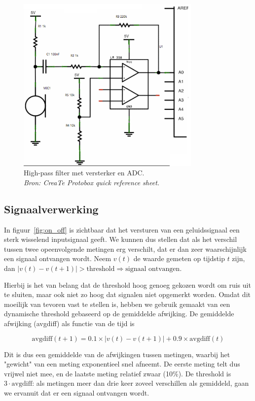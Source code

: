 \documentclass[a4paper,10pt]{article}
\begin{document}
\begin{figure}[ht!]
    \centering
    \includegraphics[width=0.8\textwidth]{high_pass_filter_circuit.png}
    \caption{High-pass filter met versterker en ADC.\\\textit{Bron: CreaTe Protobox quick reference sheet.}}
    \label{fig:circuit}
\end{figure}


\subsection{Signaalverwerking}
In figuur~\ref{fig:on_off} is zichtbaar dat het versturen van een geluidssignaal een sterk wisselend inputsignaal geeft. We kunnen dus stellen dat als het verschil tussen twee opeenvolgende metingen erg verschilt, dat er dan zeer waarschijnlijk een signaal ontvangen wordt. Neem $v(t)$ de waarde gemeten op tijdstip $t$ zijn, dan $|v(t) - v(t+1)| > \text{threshold} \Rightarrow \text{signaal ontvangen}$.

Hierbij is het van belang dat de threshold hoog genoeg gekozen wordt om ruis uit te sluiten, maar ook niet zo hoog dat signalen niet opgemerkt worden. Omdat dit moeilijk van tevoren vast te stellen is, hebben we gebruik gemaakt van een dynamische threshold gebaseerd op de gemiddelde afwijking. De gemiddelde afwijking (avgdiff) als functie van de tijd is

$$\text{avgdiff}(t+1) = 0.1\times |v(t) - v(t+1)| + 0.9\times\text{avgdiff}(t)$$

Dit is dus een gemiddelde van de afwijkingen tussen metingen, waarbij het "gewicht" van een meting exponentieel snel afneemt. De eerste meting telt dus vrijwel niet mee, en de laatste meting relatief zwaar (10\%). De threshold is $3\cdot\text{avgdiff}$: als metingen meer dan drie keer zoveel verschillen als gemiddeld, gaan we ervanuit dat er een signaal ontvangen wordt.
\end{document}
